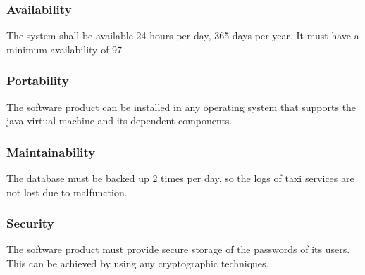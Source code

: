 \subsubsection{Availability}
The system shall be available 24 hours per day, 365 days per year.
It must have a minimum availability of 97%

\subsubsection{Portability}
The software product can be installed in any operating system that supports the java virtual machine and its dependent components.

\subsubsection{Maintainability}
The database must be backed up 2 times per day, so the logs of taxi services are not lost due to malfunction.

\subsubsection{Security}
  The software product must provide secure storage of the passwords of its users. This can be achieved by using any cryptographic techniques.